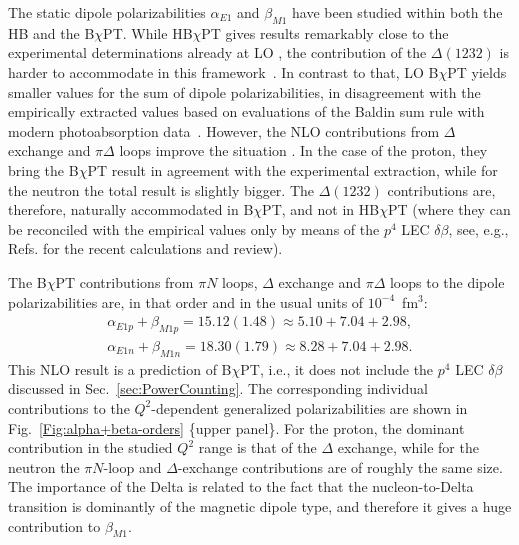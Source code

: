 \documentclass[12pt,preprint,tightenlines,
showpacs,preprintnumbers,amsmath,amssymb,
a4paper,nofootinbib]{revtex4-2}
\begin{document}
The static dipole polarizabilities $\alpha_{E1}$ and $\beta_{M1}$ have been  studied  within both the HB  and
the B$\chi$PT. While  HB$\chi$PT gives results
remarkably close to the experimental determinations already at LO \cite{Bernard:1995dp},
the contribution of the $\Delta(1232)$ is harder to accommodate in this framework~\cite{Hemmert:1996rw}. In contrast to that, LO  B$\chi$PT \cite{Bernard:1991rq,Bernard:1991ru}
yields smaller values for the sum of dipole polarizabilities, in disagreement with the empirically extracted values based on evaluations of the Baldin sum rule with modern photoabsorption data~\cite{Babusci:1997ij,Olm01,Gryniuk:2015aa}. However, the NLO contributions from $\Delta$ exchange and $\pi\Delta$ loops improve the situation \cite{Lensky:2009uv,Lensky:2015awa}.
In the case of the proton, they bring the B$\chi$PT result in agreement with the experimental extraction, while for the neutron the total result is slightly bigger. The $\Delta(1232)$ contributions are, therefore, naturally accommodated in B$\chi$PT, and not in HB$\chi$PT (where they can be reconciled with the empirical values only by means of the $p^4$ LEC $\delta\beta$, see, e.g., Refs. \cite{Griesshammer:2012we,McGovern:2012ew} for the recent calculations and review).

The B$\chi$PT contributions from $\pi N$ loops, $\Delta$ exchange and $\pi \Delta$ loops to the dipole polarizabilities are, in that order and in the usual units of $10^{-4}$~fm$^3$:
\begin{subequations}
\label{Eq:alpha+betaRealPoint}
\begin{align}
\alpha_{E1p}+\beta_{M1p}=15.12(1.48) \approx 5.10+7.04+2.98, \label{Eq:alpha+betaProtonRealPoint}\\
\alpha_{E1n}+\beta_{M1n} =18.30(1.79)\approx 8.28+7.04+2.98. \label{Eq:alpha+betaNeutronRealPoint}
\end{align}
\end{subequations}
This NLO result is a prediction of B$\chi$PT, i.e., it does not include the $p^4$ LEC $\delta\beta$ discussed in Sec.~\ref{sec:PowerCounting}.
The corresponding individual contributions to the $Q^2$-dependent generalized polarizabilities are shown in Fig.~\ref{Fig:alpha+beta-orders} \{upper panel\}.
For the proton, the dominant contribution in the studied $Q^2$ range is that of the $\Delta$ exchange, while for the neutron the $\pi N$-loop and $\Delta$-exchange contributions are of roughly the same size.
The importance of the Delta is related to the fact that the nucleon-to-Delta transition is dominantly of the magnetic dipole type, and therefore it gives a huge contribution to $\beta_{M1}$. 
\end{document}
